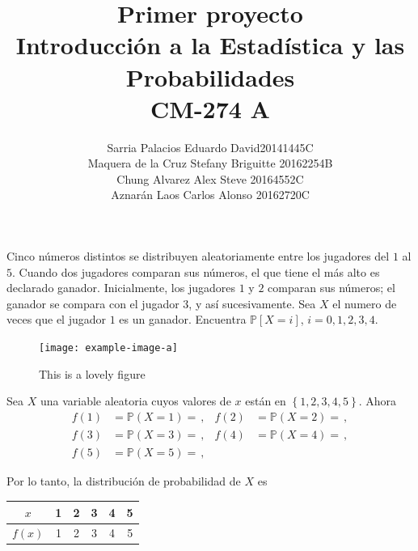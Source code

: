 \documentclass[11pt,answers,addpoints,a4paper,tittlepage=true,DIV=15,headsepline]{kommaexam}%
\date{}
\author{
	Sarria Palacios Eduardo David\quad\hfill 20141445C\\
	Maquera de la Cruz Stefany Briguitte		\quad\hfill 20162254B\\
	Chung Alvarez Alex Steve	\quad\hfill 20164552C\\
	Aznarán Laos Carlos Alonso	\quad\hfill 20162720C\\
}
\title{Primer proyecto\\
	Introducción a la Estadística y las Probabilidades\\
	CM-274 A}
\theoremstyle{definition}
\begin{document}
\begin{coverpages}
\clearpage\maketitle
\thispagestyle{empty}
\end{coverpages}


\begin{center}
\end{center}

\begin{questions}

	\question%
	Cinco números distintos se distribuyen aleatoriamente entre los jugadores del $1$ al $5$. Cuando dos jugadores comparan sus números, el que tiene el más alto es declarado ganador. Inicialmente, los jugadores $1$ y $2$ comparan sus números; el ganador se compara con el jugador $3$, y así sucesivamente. Sea $X$ el numero de veces que el jugador $1$ es un ganador. Encuentra $\mathds{P}[X = i]$, $i = 0, 1, 2, 3, 4$.
	
	\ifprintanswers
	\begin{figure}[!ht]
		\centering
		\texttt{[image: example-image-a]}
		\caption{This is a lovely figure}
		\label{fig:lovely}
	\end{figure}
	\fi
	\begin{solutionorbox}
	Sea $X$ una variable aleatoria cuyos valores de $x$ están en $\left\{1,2,3,4,5\right\}$. Ahora
	\begin{align*}
	f(1) &= \mathds{P}\left(X=1\right)=\frac{}{}, & 	f(2) &= \mathds{P}\left(X=2\right)=\frac{}{}, \\
	f(3) &= \mathds{P}\left(X=3\right)=\frac{}{}, & 	f(4) &= \mathds{P}\left(X=4\right)=\frac{}{}, \\
	f(5) &= \mathds{P}\left(X=5\right)=\frac{}{}, & 			 &
	\end{align*}
	
	Por lo tanto, la distribución de probabilidad de $X$ es
	
	\centering
	\begin{tabular}{c|ccccc}
		$x$ 	& 1 & 2 & 3 & 4 & 5 \\
		\hline
		$f(x)$& 1 & 2 & 3 & 4 & 5
	\end{tabular}


\end{solutionorbox}
\end{questions}
\end{document}
